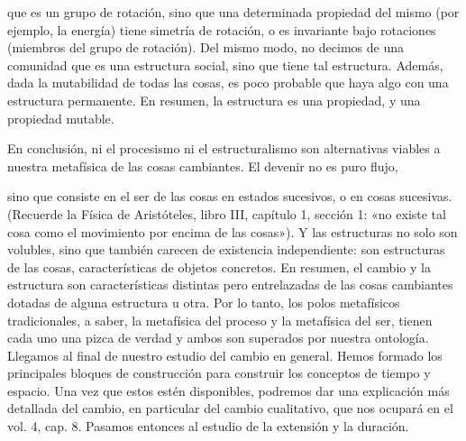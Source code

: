 \begin{justifying}
  que es un grupo de rotación, sino que una determinada propiedad del mismo (por ejemplo, la
  energía) tiene simetría de rotación, o es invariante bajo rotaciones (miembros
  del grupo de rotación). Del mismo modo, no decimos de una comunidad que es una
  estructura social, sino que tiene tal estructura. Además, dada
  la mutabilidad de todas las cosas, es poco probable que haya algo con una
  estructura permanente. En resumen, la estructura es una propiedad, y una propiedad
  mutable.

  En conclusión, ni el procesismo ni el estructuralismo son alternativas viables
  a nuestra metafísica de las cosas cambiantes. El devenir no es puro flujo,

  sino que consiste en el ser de las cosas en estados sucesivos, o en cosas sucesivas.
  (Recuerde la Física de Aristóteles, libro III, capítulo 1, sección 1: «no existe tal
  cosa como el movimiento por encima de las cosas»). Y las estructuras no solo son
  volubles, sino que también carecen de existencia independiente: son estructuras de
  las cosas, características de objetos concretos. En resumen, el cambio y la estructura son
  características distintas pero entrelazadas de las cosas cambiantes dotadas de
  alguna estructura u otra. Por lo tanto, los polos metafísicos tradicionales,
  a saber, la metafísica del proceso y la metafísica del ser, tienen cada uno una pizca de
  verdad y ambos son superados por nuestra ontología.
  Llegamos al final de nuestro estudio del cambio en general. Hemos
  formado los principales bloques de construcción para construir los conceptos de tiempo
  y espacio. Una vez que estos estén disponibles, podremos dar una
  explicación más detallada del cambio, en particular del cambio cualitativo,
  que nos ocupará en el vol. 4, cap. 8. Pasamos entonces al estudio de la
  extensión y la duración.

\end{justifying}